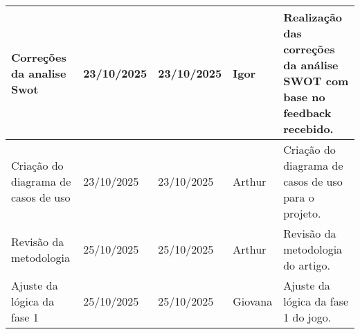 \documentclass[
landscape,
  a4paper,%
  12pt,%
  english,%
  brazilian,%
]{article}
\begin{document}
\begin{table}[]
\begin{tabular}{|p{5cm}|l|l|l|p{8cm}|}
Correções da analise Swot                         & 23/10/2025 & 23/10/2025 & Igor   & Realização das correções da análise SWOT com base no feedback recebido. \\ \hline
Criação do diagrama de casos de uso               & 23/10/2025 & 23/10/2025 & Arthur   & Criação do diagrama de casos de uso para o projeto. \\ \hline
Revisão da metodologia                             & 25/10/2025 & 25/10/2025 & Arthur   & Revisão da metodologia do artigo. \\ \hline
Ajuste da lógica da fase 1                         & 25/10/2025 & 25/10/2025 & Giovana   & Ajuste da lógica da fase 1 do jogo. \\ \hline

\end{tabular}
\end{table}

\break
\end{document}
